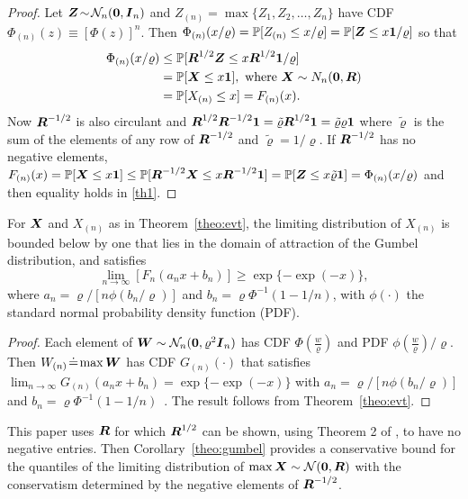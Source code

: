 \begin{proof}
  Let $\boldsymbol{Z}\!\sim\! \mathcal N_n(\boldsymbol{0},\boldsymbol{I}_n)$ and $Z_{(n)} =
  \max{\{Z_1,Z_2,\ldots,Z_n\}}$ have CDF $\Phi_{(n)}(z)\equiv [\Phi(z)]^n$. 
  Then $\Phi_{(n)}(x/\varrho)  =
  \mathbb{P}[Z_{(n)} \leq x/\varrho] = \mathbb{P}[\boldsymbol{Z} \leq   x \boldsymbol{1}/\varrho]$ so that
  \begin{equation}
    \begin{split}
\Phi_{(n)}(x/\varrho) & \leq\mP[{\bR}^{1/2}\bZ \leq x {\bR}^{1/2}\bone/\varrho]\\ %
      & =   \mP[\bX \leq x \bone], \mbox{ where } \bX\sim N_n(\bzero,\bR)\\
      &    = \mP[X_{(n)}\leq x] = F_{(n)}(x).\\
      \label{th1}
  \end{split}
\end{equation}
Now $\boldsymbol{R}^{-1/2}$ is also circulant and 
$\boldsymbol{R}^{1/2}\boldsymbol{R}^{-1/2}\boldsymbol{1} = \tilde\varrho\boldsymbol{R}^{1/2}\boldsymbol{1} =
\tilde\varrho\varrho\boldsymbol{1}$ where $\tilde\varrho$ is the
sum of the elements of any row of  
$\boldsymbol{R}^{-1/2}$ and 
$\tilde\varrho=1/\varrho$. If $\boldsymbol{R}^{-1/2}$ has no negative elements, $F_{(n)}(x)=\mathbb{P}[\boldsymbol{X} \leq x \boldsymbol{1}]\leq \mathbb{P}[{\boldsymbol{R}}^{-1/2}\boldsymbol{X} \leq x
{\boldsymbol{R}}^{-1/2}\boldsymbol{1}] =\mathbb{P}[\boldsymbol{Z} \leq x\tilde\varrho\boldsymbol{1}] =
\Phi_{(n)}(x/\varrho) $ and then equality holds in \eqref{th1}.
\end{proof}
\begin{corollary}
  \label{theo:gumbel}
  For $\boldsymbol{X}$ and $X_{(n)}$ as in Theorem~\ref{theo:evt}, the limiting
  distribution of $X_{(n)}$ is bounded below by one that lies in the
  domain of  attraction of   the Gumbel distribution, 
  and satisfies 
  \begin{equation}
    \lim_{n\rightarrow \infty}[F_n(a_n x + b_n)] \geq \exp\{-\exp(-x)\},
\end{equation}
where $a_n = \varrho/[ n \phi(b_n/\varrho)]$ and $b_n =\varrho
\Phi^{-1}(1-1/n)$, with $\phi(\cdot)$ the standard normal
probability density function (PDF).
\end{corollary}
\begin{proof}
Each element of $\boldsymbol{W}\sim \mathcal N_n(\boldsymbol{0},\varrho^2\boldsymbol{I}_n)$ has CDF
$\Phi(\frac w\varrho)$ and PDF
  $\phi(\frac w\varrho)/\varrho$. Then
  $W_{(n)}\!\doteq\!\max\boldsymbol{W}$  has CDF $G_{(n)}(\cdot)$ that satisfies
  $\lim_{n\rightarrow     \infty}G_{(n)}(a_n x + b_n)\!=\! 
  \exp\{-\exp(-x)\}$ with $a_n\!=\!\varrho/[n \phi(b_n/\varrho)]$ and
  $b_n\!=\!\varrho\Phi^{-1}(1-1/n)$~\citet{resnick13}.
  The result follows from   Theorem~\ref{theo:evt}.
\end{proof}
This paper uses $\boldsymbol{R}$ for which $\boldsymbol{R}^{1/2}$ can be
shown, using Theorem 2 of \citet{maitra19}, to have no negative
entries. Then Corollary~\ref{theo:gumbel}  provides a
conservative bound for the quantiles of the limiting distribution of
$\max\boldsymbol{X}\sim\mathcal N(\boldsymbol{0},\boldsymbol{R})$ with the conservatism 
determined by the negative elements of $\boldsymbol{R}^{-1/2}$.


